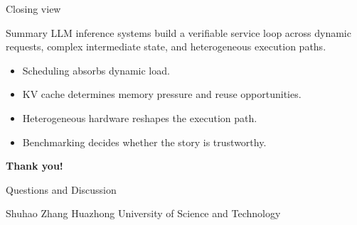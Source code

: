 \documentclass[aspectratio=169,11pt]{beamer}
\begin{document}
\begin{frame}{Closing view}
  \begin{block}{Summary}
    LLM inference systems build a verifiable service loop across dynamic requests, complex intermediate state, and heterogeneous execution paths.
  \end{block}
  \begin{itemize}
    \item Scheduling absorbs dynamic load.
    \item KV cache determines memory pressure and reuse opportunities.
    \item Heterogeneous hardware reshapes the execution path.
    \item Benchmarking decides whether the story is trustworthy.
  \end{itemize}
\end{frame}

\begin{frame}[plain]
  \vspace{1.25cm}
  \centering
  {\Huge\bfseries\textcolor{HUSTBlue}{Thank you!}}\par
  \vspace{0.35cm}
  {\Large Questions and Discussion}\par
  \vspace{0.8cm}
  \textcolor{HUSTGray}{Shuhao Zhang \quad Huazhong University of Science and Technology}
\end{frame}
\end{document}
